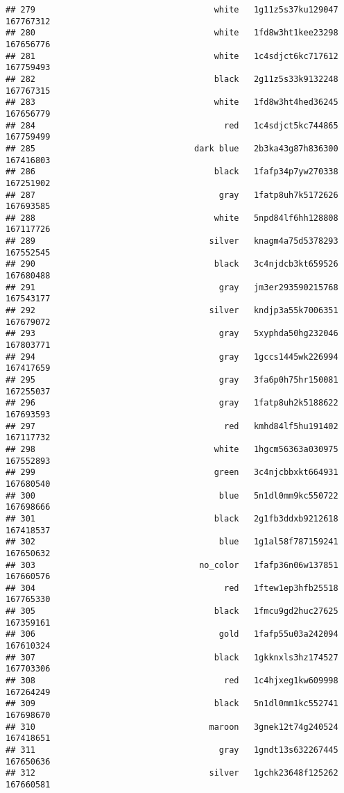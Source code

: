 \documentclass[
]{article}
\begin{document}
\begin{verbatim}
## 279                                    white   1g11z5s37ku129047 167767312
## 280                                    white   1fd8w3ht1kee23298 167656776
## 281                                    white   1c4sdjct6kc717612 167759493
## 282                                    black   2g11z5s33k9132248 167767315
## 283                                    white   1fd8w3ht4hed36245 167656779
## 284                                      red   1c4sdjct5kc744865 167759499
## 285                                dark blue   2b3ka43g87h836300 167416803
## 286                                    black   1fafp34p7yw270338 167251902
## 287                                     gray   1fatp8uh7k5172626 167693585
## 288                                    white   5npd84lf6hh128808 167117726
## 289                                   silver   knagm4a75d5378293 167552545
## 290                                    black   3c4njdcb3kt659526 167680488
## 291                                     gray   jm3er293590215768 167543177
## 292                                   silver   kndjp3a55k7006351 167679072
## 293                                     gray   5xyphda50hg232046 167803771
## 294                                     gray   1gccs1445wk226994 167417659
## 295                                     gray   3fa6p0h75hr150081 167255037
## 296                                     gray   1fatp8uh2k5188622 167693593
## 297                                      red   kmhd84lf5hu191402 167117732
## 298                                    white   1hgcm56363a030975 167552893
## 299                                    green   3c4njcbbxkt664931 167680540
## 300                                     blue   5n1dl0mm9kc550722 167698666
## 301                                    black   2g1fb3ddxb9212618 167418537
## 302                                     blue   1g1al58f787159241 167650632
## 303                                 no_color   1fafp36n06w137851 167660576
## 304                                      red   1ftew1ep3hfb25518 167765330
## 305                                    black   1fmcu9gd2huc27625 167359161
## 306                                     gold   1fafp55u03a242094 167610324
## 307                                    black   1gkknxls3hz174527 167703306
## 308                                      red   1c4hjxeg1kw609998 167264249
## 309                                    black   5n1dl0mm1kc552741 167698670
## 310                                   maroon   3gnek12t74g240524 167418651
## 311                                     gray   1gndt13s632267445 167650636
## 312                                   silver   1gchk23648f125262 167660581

\end{verbatim}
\end{document}
